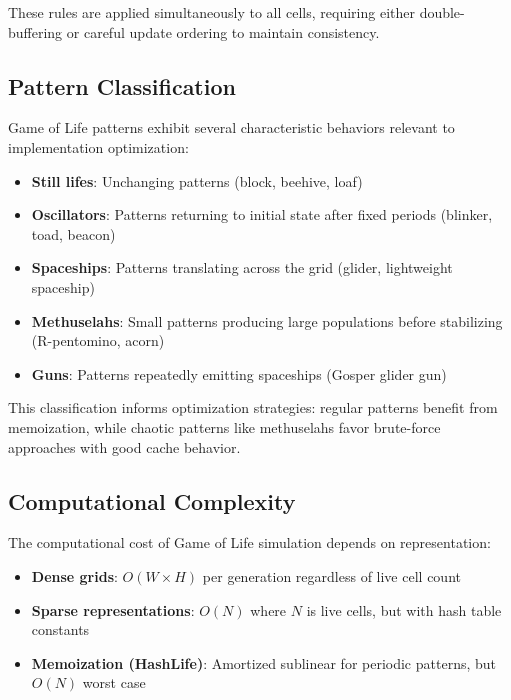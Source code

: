 \documentclass[11pt]{article}
\theoremstyle{definition}
\begin{document}
    These rules are applied simultaneously to all cells, requiring either double-buffering or careful update ordering to maintain consistency.

    \subsection{Pattern Classification}

    Game of Life patterns exhibit several characteristic behaviors relevant to implementation optimization:

    \begin{itemize}
        \item \textbf{Still lifes}: Unchanging patterns (block, beehive, loaf)
        \item \textbf{Oscillators}: Patterns returning to initial state after fixed periods (blinker, toad, beacon)
        \item \textbf{Spaceships}: Patterns translating across the grid (glider, lightweight spaceship)
        \item \textbf{Methuselahs}: Small patterns producing large populations before stabilizing (R-pentomino, acorn)
        \item \textbf{Guns}: Patterns repeatedly emitting spaceships (Gosper glider gun)
    \end{itemize}

    This classification informs optimization strategies: regular patterns benefit from memoization, while chaotic patterns like methuselahs favor brute-force approaches with good cache behavior.

    \subsection{Computational Complexity}

    The computational cost of Game of Life simulation depends on representation:

    \begin{itemize}
        \item \textbf{Dense grids}: $O(W \times H)$ per generation regardless of live cell count
        \item \textbf{Sparse representations}: $O(N)$ where $N$ is live cells, but with hash table constants
        \item \textbf{Memoization (HashLife)}: Amortized sublinear for periodic patterns, but $O(N)$ worst case
    \end{itemize}
\end{document}
